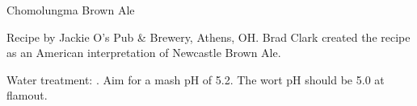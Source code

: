 \stylesection{\stylealternativesugarbeer}

\begin{recipe}{Chomolungma Brown Ale}

\begin{aboutblock}
Recipe by Jackie O's Pub \& Brewery, Athens, OH. Brad Clark created the recipe
as an American interpretation of Newcastle Brown Ale.
\end{aboutblock}


\begin{methodandtiming}
 
\begin{mashsteps}
\end{mashsteps}

\begin{fermentationsteps}
\end{fermentationsteps}

\begin{directions}
Water treatment: . Aim for a mash pH of 5.2.
The wort pH should be 5.0 at flamout. 
\end{directions}

\end{methodandtiming}

\recipebreak

\begin{ingredientsblock}

\begin{malts}
\end{malts}

\begin{hops}
\end{hops}


\end{ingredientsblock}

\end{recipe}